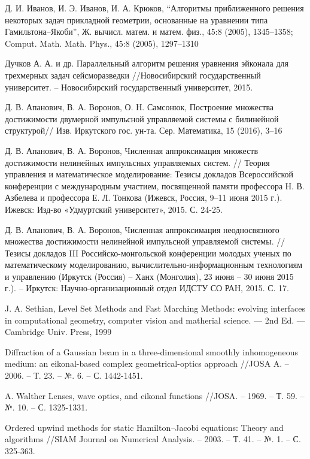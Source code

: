 \begin{thebibliography}{99}
 {Д. И. Иванов, И. Э. Иванов, И. А. Крюков}, “Алгоритмы
  приближенного решения некоторых задач прикладной геометрии,
  основанные на уравнении типа Гамильтона–Якоби”, Ж. вычисл. матем. и
  матем. физ., 45:8 (2005), 1345–1358; Comput. Math. Math. Phys., 45:8
  (2005), 1297–1310

 {Дучков А. А. и др.} Параллельный алгоритм решения
  уравнения эйконала для трехмерных задач сейсморазведки
  //Новосибирский государственный университет. – Новосибирский
  государственный университет, 2015.
  
 {Д. В. Апанович, В. А. Воронов, О. Н. Самсонюк},
  Построение множества достижимости двумерной импульсной управляемой
  системы с билинейной структурой// Изв. Иркутского
  гос. ун-та. Сер. Математика, 15 (2016), 3–16

 {Д. В. Апанович, В. А. Воронов}, Численная аппроксимация
  множеств достижимости нелинейных импульсных управляемых систем. //
  Теория управления и математическое моделирование: Тезисы докладов
  Всероссийской конференции с международным участием, посвященной
  памяти профессора Н. В. Азбелева и профессора Е. Л. Тонкова (Ижевск,
  Россия, 9–11 июня 2015 г.). Ижевск: Изд-во «Удмуртский университет»,
  2015. С. 24-25.

 {Д. В. Апанович, В. А. Воронов}, Численная аппроксимация
  неодносвязного множества достижимости нелинейной импульсной
  управляемой системы. // Тезисы докладов III Российско-монгольской
  конференции молодых ученых по математическому моделированию,
  вычислительно-информационным технологиям и управлению (Иркутск
  (Россия) – Ханх (Монголия), 23 июня – 30 июня 2015 г.). – Иркутск:
  Научно-организационный отдел ИДСТУ СО РАН, 2015. С. 17.
  
 {J. A. Sethian}, Level Set Methods and Fast Marching
  Methods: evolving interfaces in computational geometry, computer
  vision and matherial science. — 2nd Ed. — Cambridge Univ. Press,
  1999

 Diffraction of a Gaussian beam
  in a three-dimensional smoothly inhomogeneous medium: an
  eikonal-based complex geometrical-optics approach //JOSA A. –
  2006. – Т. 23. – №. 6. – С. 1442-1451.

 {A. Walther} Lenses, wave optics, and eikonal
  functions //JOSA. – 1969. – Т. 59. – №. 10. – С. 1325-1331.
  
 Ordered upwind methods
  for static Hamilton--Jacobi equations: Theory and algorithms //SIAM
  Journal on Numerical Analysis. – 2003. – Т. 41. – №. 1. –
  С. 325-363.
  

\end{thebibliography}

